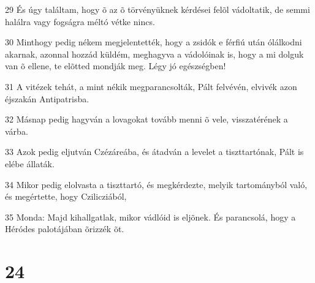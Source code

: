 \par 29 És úgy találtam, hogy õ az õ törvényüknek kérdései felõl vádoltatik, de semmi halálra vagy fogságra méltó vétke nincs.
\par 30 Minthogy pedig nékem megjelentették, hogy a zsidók e férfiú után ólálkodni akarnak, azonnal hozzád küldém, meghagyva a vádolóinak is, hogy a mi dolguk van õ ellene, te elõtted mondják meg. Légy jó egészségben!
\par 31 A vitézek tehát, a mint nékik megparancsolták, Pált felvévén, elvivék azon éjszakán Antipatrisba.
\par 32 Másnap pedig hagyván a lovagokat tovább menni õ vele, visszatérének a várba.
\par 33 Azok pedig eljutván Czézáreába, és átadván a levelet a tiszttartónak, Pált is elébe állaták.
\par 34 Mikor pedig elolvasta a tiszttartó, és megkérdezte, melyik tartományból való, és megértette, hogy Czilicziából,
\par 35 Monda: Majd kihallgatlak, mikor vádlóid is eljõnek. És parancsolá, hogy a Héródes palotájában õrizzék õt.

\chapter{24}

